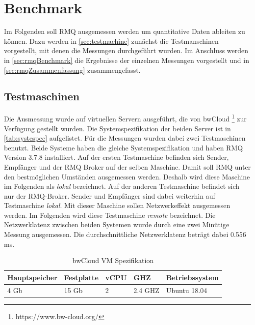 \section{Benchmark}
Im Folgenden soll RMQ ausgemessen werden um quantitative Daten ableiten zu können. Dazu werden in \autoref{sec:testmachine} zunächst die Testmanschinen vorgestellt, mit denen die Messungen durchgeführt wurden. Im Anschluss werden in \autoref{sec:rmqBenchmark} die Ergebnisse der einzelnen Messungen vorgestellt und in \autoref{sec:rmqZusammenfassung} zusammengefasst.

\subsection{Testmaschinen}
\label{sec:testmachine}
Die Ausmessung wurde auf virtuellen Servern ausgeführt, die von bwCloud \footnote{https://www.bw-cloud.org/} zur Verfügung gestellt wurden. Die Systemspezifikation der beiden Server ist in \autoref{tab:systespec} aufgelistet. Für die Messungen wurden dabei zwei Testmaschinen benutzt. Beide Systeme haben die gleiche Systemspezifikation und haben RMQ Version 3.7.8 installiert. Auf der ersten Testmaschine befinden sich Sender, Empfänger und der RMQ Broker auf der selben Maschine. Damit soll RMQ unter den bestmöglichen Umständen ausgemessen werden. Deshalb wird diese Maschine im Folgenden als \textit{lokal} bezeichnet. Auf der anderen Testmaschine befindet sich nur der RMQ-Broker. Sender und Empfänger sind dabei weiterhin auf Testmaschine \textit{lokal}. Mit dieser Maschine sollen Netzwerkeffekt ausgemessen werden. Im Folgenden wird diese Testmaschine \textit{remote} bezeichnet. Die Netzwerklatenz zwischen beiden Systemen wurde durch eine zwei Minütige Messung ausgemessen. Die durchschnittliche Netzwerklatenz beträgt dabei 0.556 ms. 

\begin{table}
  \centering
  \begin{tabular}{|l|l|l|l|l|}
    Hauptspeicher & Festplatte & vCPU & GHZ & Betriebssystem \\
    \hline
     4 Gb & 15 Gb & 2 & 2.4 GHZ & Ubuntu 18.04
  \end{tabular}
	\caption{\label{tab:systespec} bwCloud VM Spezifikation}
\end{table}

